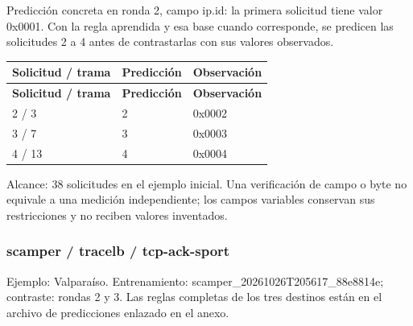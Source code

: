 Predicción concreta en ronda 2, campo ip.id: la primera solicitud tiene valor 0x0001. Con la regla aprendida y esa base cuando corresponde, se predicen las solicitudes 2 a 4 antes de contrastarlas con sus valores observados.

\begingroup
\fontsize{9}{11}\selectfont
\addtocounter{table}{-1}
\begin{longtable}{p{3.2cm}p{5.1cm}p{5.1cm}}
\toprule
\textbf{Solicitud / trama} & \textbf{Predicción} & \textbf{Observación} \\ \midrule
\endfirsthead
\toprule
\textbf{Solicitud / trama} & \textbf{Predicción} & \textbf{Observación} \\ \midrule
\endhead
2 / 3 & 2 & 0x0002 \\
3 / 7 & 3 & 0x0003 \\
4 / 13 & 4 & 0x0004 \\
\bottomrule
\end{longtable}
\endgroup
Alcance: 38 solicitudes en el ejemplo inicial. Una verificación de campo o byte no equivale a una medición independiente; los campos variables conservan sus restricciones y no reciben valores inventados.

\subsubsection{scamper / tracelb / tcp-ack-sport}
Ejemplo: Valparaíso. Entrenamiento: scamper\_\allowbreak{}20261026T205617\_\allowbreak{}88e8814e; contraste: rondas 2 y 3. Las reglas completas de los tres destinos están en el archivo de predicciones enlazado en el anexo.

